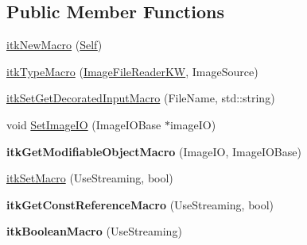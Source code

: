 \subsection*{Public Member Functions}
\begin{DoxyCompactItemize}
\item 
\hyperlink{classitk_1_1_image_file_reader_k_w_a4513482202af52da330f62385fe410d2}{itk\-New\-Macro} (\hyperlink{classitk_1_1_image_file_reader_k_w_a6616e1e0fe9f4aceb7f693250b5f5b5c}{Self})
\item 
\hyperlink{classitk_1_1_image_file_reader_k_w_a47c81c07c8aee4750469f79c97076e87}{itk\-Type\-Macro} (\hyperlink{classitk_1_1_image_file_reader_k_w}{Image\-File\-Reader\-K\-W}, Image\-Source)
\item 
\hyperlink{classitk_1_1_image_file_reader_k_w_ab33b100a76cddfc01310a5b167994cd7}{itk\-Set\-Get\-Decorated\-Input\-Macro} (File\-Name, std\-::string)
\item 
void \hyperlink{classitk_1_1_image_file_reader_k_w_a5f6df1f414ee32ffc1a7042a2ac7769d}{Set\-Image\-I\-O} (Image\-I\-O\-Base $\ast$image\-I\-O)
\item 
\hypertarget{classitk_1_1_image_file_reader_k_w_a34921bf522b330b9d2a6904019fea262}{{\bfseries itk\-Get\-Modifiable\-Object\-Macro} (Image\-I\-O, Image\-I\-O\-Base)}\label{classitk_1_1_image_file_reader_k_w_a34921bf522b330b9d2a6904019fea262}

\item 
\hyperlink{classitk_1_1_image_file_reader_k_w_adabd23848a1de6aaefe2108eed86de30}{itk\-Set\-Macro} (Use\-Streaming, bool)
\item 
\hypertarget{classitk_1_1_image_file_reader_k_w_aa762efa75974bceb3af017e411962d01}{{\bfseries itk\-Get\-Const\-Reference\-Macro} (Use\-Streaming, bool)}\label{classitk_1_1_image_file_reader_k_w_aa762efa75974bceb3af017e411962d01}

\item 
\hypertarget{classitk_1_1_image_file_reader_k_w_a024a210a9cf0362a910f08efce300ce9}{{\bfseries itk\-Boolean\-Macro} (Use\-Streaming)}\label{classitk_1_1_image_file_reader_k_w_a024a210a9cf0362a910f08efce300ce9}

\end{DoxyCompactItemize}
